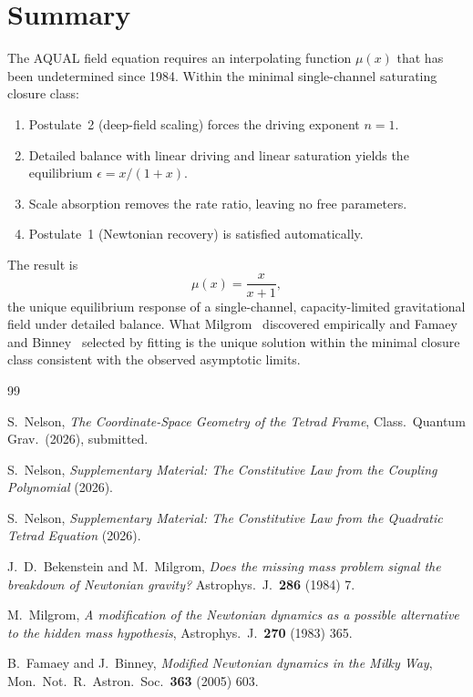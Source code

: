 \documentclass[twocolumn]{iopjournal}
\begin{document}
\section*{Summary}

The AQUAL field equation requires an interpolating function
$\mu(x)$ that has been undetermined since 1984. Within the minimal
single-channel saturating closure class:

\begin{enumerate}
\item Postulate~2 (deep-field scaling) forces the driving exponent
  $n = 1$.
\item Detailed balance with linear driving and linear saturation
  yields the equilibrium $\epsilon = x/(1+x)$.
\item Scale absorption removes the rate ratio, leaving no free
  parameters.
\item Postulate~1 (Newtonian recovery) is satisfied automatically.
\end{enumerate}

The result is
\begin{equation}
  \mu(x) = \frac{x}{x + 1},
\end{equation}
the unique equilibrium response of a single-channel,
capacity-limited gravitational field under detailed balance.
What Milgrom~\cite{Milgrom1983} discovered empirically and Famaey
and Binney~\cite{FamaeyBinney2005} selected by fitting is the
unique solution within the minimal closure class consistent with
the observed asymptotic limits.


\begin{thebibliography}{99}

S.~Nelson,
\textit{The Coordinate-Space Geometry of the Tetrad Frame},
Class.\ Quantum Grav.\ (2026), submitted.

S.~Nelson,
\textit{Supplementary Material: The Constitutive Law from the
Coupling Polynomial} (2026).

S.~Nelson,
\textit{Supplementary Material: The Constitutive Law from the
Quadratic Tetrad Equation} (2026).

J.~D.~Bekenstein and M.~Milgrom,
\textit{Does the missing mass problem signal the breakdown of
Newtonian gravity?}
Astrophys.\ J.\ \textbf{286} (1984) 7.

M.~Milgrom,
\textit{A modification of the Newtonian dynamics as a possible
alternative to the hidden mass hypothesis},
Astrophys.\ J.\ \textbf{270} (1983) 365.

B.~Famaey and J.~Binney,
\textit{Modified Newtonian dynamics in the Milky Way},
Mon.\ Not.\ R.\ Astron.\ Soc.\ \textbf{363} (2005) 603.

\end{thebibliography}
\end{document}
